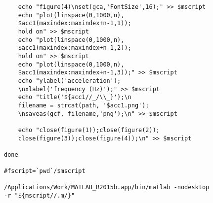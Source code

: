 \documentclass{sigchi}
\begin{document}
\begin{lstlisting}
	echo "figure(4)\nset(gca,'FontSize',16);" >> $mscript
	echo "plot(linspace(0,1000,n), 
    $acc1(maxindex:maxindex+n-1,1)); 
    hold on" >> $mscript
	echo "plot(linspace(0,1000,n),
    $acc1(maxindex:maxindex+n-1,2)); 
    hold on" >> $mscript
	echo "plot(linspace(0,1000,n),
    $acc1(maxindex:maxindex+n-1,3));" >> $mscript
	echo "ylabel('acceleration');
    \nxlabel('frequency (Hz)');" >> $mscript
	echo "title('${acc1//_/\\_}');\n
    filename = strcat(path, '$acc1.png');
    \nsaveas(gcf, filename,'png');\n" >> $mscript

	echo "close(figure(1));close(figure(2));
    close(figure(3));close(figure(4));\n" >> $mscript

done

#fscript=`pwd`/$mscript

/Applications/Work/MATLAB_R2015b.app/bin/matlab -nodesktop 
-r "${mscript//.m/}"
\end{lstlisting}
\end{document}
